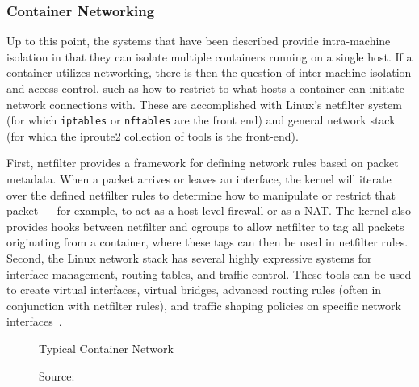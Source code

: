 \documentclass[12pt,titlepage]{article}
\begin{document}
\subsubsection{Container Networking}
Up to this point, the systems that have been described provide intra-machine isolation in that they can isolate multiple containers running on a single host.
If a container utilizes networking, there is then the question of inter-machine isolation and access control, such as how to restrict to what hosts a container can initiate network connections with.
These are accomplished with Linux's netfilter system (for which \texttt{iptables} or \texttt{nftables} are the front end) and general network stack (for which the iproute2 collection of tools is the front-end).

First, netfilter provides a framework for defining network rules based on packet metadata.
When a packet arrives or leaves an interface, the kernel will iterate over the defined netfilter rules to determine how to manipulate or restrict that packet --- for example, to act as a host-level firewall or as a NAT\@.
The kernel also provides hooks between netfilter and cgroups to allow netfilter to tag all packets originating from a container, where these tags can then be used in netfilter rules.
Second, the Linux network stack has several highly expressive systems for interface management, routing tables, and traffic control.
These tools can be used to create virtual interfaces, virtual bridges, advanced routing rules (often in conjunction with netfilter rules), and traffic shaping policies on specific network interfaces~\cite{iproute2wiki,netfilterhome}.

\begin{figure}
	\centering
	\caption{Typical Container Network}
	\caption*{Source:~\cite{dockercontainernetwork}}
\end{figure}
\end{document}
